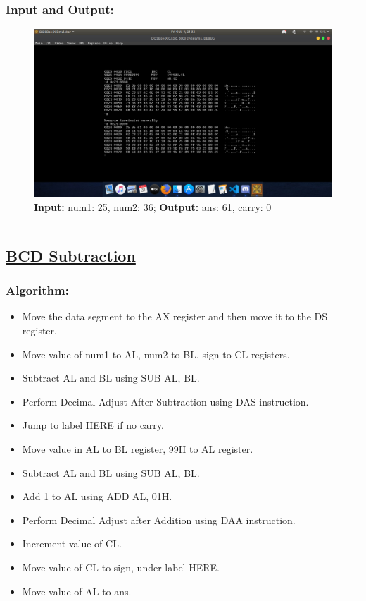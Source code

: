 \documentclass[10pt,a4paper]{article}
\begin{document}
\begin{flushleft}
\subsubsection*{\textbf{Input and Output:}}
\begin{figure}[h]
    \centering
    \includegraphics[trim = 100mm 60mm 100mm 80mm, clip, width = \textwidth]{Pics/BAIO.png}
    \caption{ \textbf{Input:} num1: 25, num2: 36; \newline \hspace{1cm}
                \textbf{Output:} ans: 61, carry: 0}
\end{figure}
\hrule
\newpage
\subsection*{\textbf{\underline{BCD Subtraction}}}

\subsubsection*{\textbf{Algorithm:}}
\begin{itemize}
    \item Move the data segment to the AX register and then move it to the DS register.
    \item Move value of num1 to AL, num2 to BL, sign to CL registers.
    \item Subtract AL and BL using SUB AL, BL.
    \item Perform Decimal Adjust After Subtraction using DAS instruction.
    \item Jump to label HERE if no carry.
    \item Move value in AL to BL register, 99H to AL register.
    \item Subtract AL and BL using SUB AL, BL.
    \item Add 1 to AL using ADD AL, 01H.
    \item Perform Decimal Adjust after Addition using DAA instruction.
    \item Increment value of CL.
    \item Move value of CL to sign, under label HERE.
    \item Move value of AL to ans.
\end{itemize}


\end{flushleft}
\end{document}
